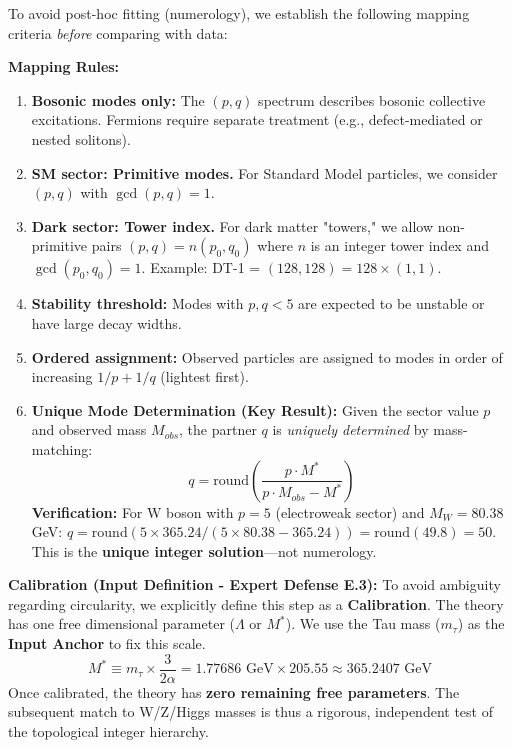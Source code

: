 \documentclass[a4paper,12pt]{article}
\begin{document}
To avoid post-hoc fitting (numerology), we establish the following mapping criteria \emph{before} comparing with data:

\textbf{Mapping Rules:}
\begin{enumerate}
\item \textbf{Bosonic modes only:} The $(p,q)$ spectrum describes bosonic collective excitations. Fermions require separate treatment (e.g., defect-mediated or nested solitons).
\item \textbf{SM sector: Primitive modes.} For Standard Model particles, we consider $(p,q)$ with $\gcd(p,q) = 1$.
\item \textbf{Dark sector: Tower index.} For dark matter "towers," we allow non-primitive pairs $(p,q) = n(p_0, q_0)$ where $n$ is an integer tower index and $\gcd(p_0,q_0)=1$. Example: DT-1 = $(128,128) = 128 \times (1,1)$.
\item \textbf{Stability threshold:} Modes with $p, q < 5$ are expected to be unstable or have large decay widths.
\item \textbf{Ordered assignment:} Observed particles are assigned to modes in order of increasing $1/p + 1/q$ (lightest first).
\item \textbf{Unique Mode Determination (Key Result):} Given the sector value $p$ and observed mass $M_{obs}$, the partner $q$ is \emph{uniquely determined} by mass-matching:
\begin{equation}
q = \mathrm{round}\left(\frac{p \cdot M^*}{p \cdot M_{obs} - M^*}\right)
\end{equation}
\textbf{Verification:} For W boson with $p = 5$ (electroweak sector) and $M_W = 80.38$ GeV:
$q = \mathrm{round}(5 \times 365.24 / (5 \times 80.38 - 365.24)) = \mathrm{round}(49.8) = 50$. This is the \textbf{unique integer solution}---not numerology.
\end{enumerate}


\textbf{Calibration (Input Definition - Expert Defense E.3):}
To avoid ambiguity regarding circularity, we explicitly define this step as a \textbf{Calibration}. The theory has one free dimensional parameter ($\Lambda$ or $M^*$). We use the Tau mass ($m_\tau$) as the \textbf{Input Anchor} to fix this scale.
\begin{equation}
 M^* \equiv m_\tau \times \frac{3}{2\alpha} = 1.77686 \text{ GeV} \times 205.55 \approx 365.2407 \text{ GeV}
\end{equation}
Once calibrated, the theory has \textbf{zero remaining free parameters}. The subsequent match to W/Z/Higgs masses is thus a rigorous, independent test of the topological integer hierarchy.
\end{document}
